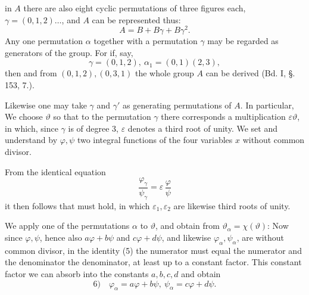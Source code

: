 in $A$ there are also eight cyclic permutations of three figures each,
$\gamma = (0, 1, 2) \ldots$, and $A$ can be represented thus:
\[
A = B + B\gamma + B\gamma^2.
\]
Any one permutation $\alpha$ together with a permutation $\gamma$ may be
regarded as generators of the group. For if, say,
\[
\gamma = (0, 1, 2),\ \alpha_1 = (0, 1)(2, 3),
\]
then
and from $(0, 1, 2), (0, 3, 1)$ the whole group $A$ can be derived
(Bd. I, \S.\,153, 7.).

Likewise one may take $\gamma$ and $\gamma'$ as generating permutations
of $A$. In particular,
We choose $\vartheta$ so that to the permutation $\gamma$ there corresponds a multiplication
$\varepsilon\vartheta$, in which, since $\gamma$ is of degree 3, $\varepsilon$ denotes a third root of unity.
 We set
and understand by $\varphi, \psi$ two integral functions of the four
variables $x$ without common divisor.

From the identical equation
\[
\frac{\varphi_\gamma}{\psi_\gamma} = \varepsilon\,\frac{\varphi}{\psi}
\]
it then follows that
must hold, in which $\varepsilon_1, \varepsilon_2$ are likewise third roots of unity.

We apply one of the permutations $\alpha$ to $\vartheta$, and obtain
 from $\vartheta_\alpha = \chi(\vartheta)$:
Now since $\varphi, \psi$, hence also $a\varphi + b\psi$ and $c\varphi + d\psi$, and
likewise $\varphi_\alpha, \psi_\alpha$, are without common divisor, in the
identity (5) the numerator must equal the numerator and the denominator the
denominator, at least up to a constant factor.
This constant factor we can absorb into the constants $a, b, c, d$
and obtain
\[
\text{6)}\quad \varphi_\alpha = a\varphi + b\psi,\ \psi_\alpha = c\varphi + d\psi.
\]

